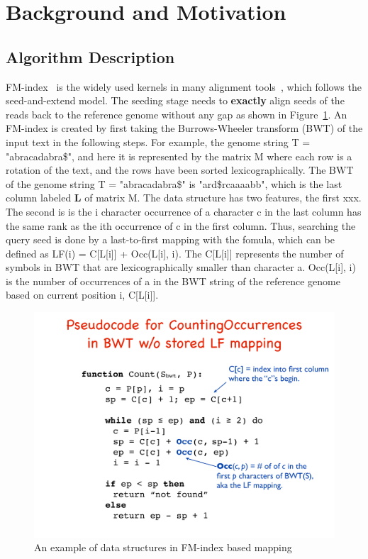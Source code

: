 \documentclass[9pt,conference]{IEEEtran}
\newcommand*\circled[1]{\tikz[baseline=(char.base)]{
		\node[shape=circle,fill,inner sep=0.5pt] (char) {\textcolor{white}{#1}};}}
\begin{document}
\section{Background and Motivation}
\subsection{Algorithm Description}
FM-index~\cite{bwt} is the widely used kernels in many alignment tools~\cite{ahmed2016comparison}, which follows the seed-and-extend model. The seeding stage needs to \textbf{exactly} align seeds of the reads back to the reference genome without any gap as shown in Figure~\ref{fig:algo-fm}. An FM-index is created by first taking the Burrows-Wheeler transform (BWT) of the input text in the following steps. For example, \circled{1} the genome string T = "abracadabra\$", \circled{2} and here it is represented by the matrix M where each row is a rotation of the text, and the rows have been sorted lexicographically. \circled{3} The BWT of the genome string T = "abracadabra\$" is "ard\$rcaaaabb", which is the last column labeled \textbf{L} of matrix M. The data structure has two features, the first xxx. The second is is the i character occurrence of a character c in the last column has the same rank as the ith occurrence of c in the first column. Thus, searching the query seed is done by a last-to-first mapping with the fomula, which can be defined as LF(i) = C[L[i]] + Occ(L[i], i). The C[L[i]] represents the number of symbols in BWT that are lexicographically smaller than character a. Occ(L[i], i) is the number of occurrences of a in the BWT string of the reference genome based on current position i, C[L[i]].
\begin{figure}[htbp]
\centering
\includegraphics[scale=0.25]{Conference-LaTeX-template_10-17-19/fig/fm-algo.pdf}
\caption{An example of data structures in FM-index based mapping}
\label{fig:algo-fm}
\end{figure}
\end{document}

